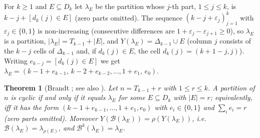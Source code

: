 \documentclass[11pt]{article}
\newtheorem{theorem}{Theorem}[section]
\theoremstyle{definition}
\newcommand{\B}{\mathcal{B}}
\renewcommand{\le}{\leqslant}
\renewcommand{\ge}{\geqslant}
\begin{document}
For $k\ge1$ and $E\subseteq D_k$ let $\lambda_E$ be the partition whose $j$-th part, $1\le j\le k$, is
$k-j+[d_k(j)\in E]$ (zero parts omitted).  The sequence $(k-j+\varepsilon_j)_{j=1}^k$ with
$\varepsilon_j\in\{0,1\}$ is non-increasing (consecutive differences are $1+\varepsilon_j-\varepsilon_{j+1}\ge0$),
so $\lambda_E$ is a partition, $|\lambda_E|=T_{k-1}+|E|$, and $Y(\lambda_E)=\Delta_{k-1}\cup E$ (column $j$ consists
of the $k-j$ cells of $\Delta_{k-1}$ and, if $d_k(j)\in E$, the cell $d_k(j)=(k+1-j,j)$).  Writing
$e_{k-j}=[d_k(j)\in E]$ we get $\lambda_E=(k-1+e_{k-1},\,k-2+e_{k-2},\dots,1+e_1,\,e_0)$.

\begin{theorem}[Brandt \cite{Br}; see also \cite{AD,Et,GH}]\label{thm:brandt}
Let $n=T_{k-1}+r$ with $1\le r\le k$.  A partition of $n$ is cyclic if and only if it equals $\lambda_E$
for some $E\subseteq D_k$ with $|E|=r$; equivalently, iff it has the form
$(k-1+e_{k-1},\dots,1+e_1,e_0)$ with $e_i\in\{0,1\}$ and $\sum_ie_i=r$ (zero parts omitted).
Moreover $Y(\B(\lambda_E))=\rho(Y(\lambda_E))$, i.e.\ $\B(\lambda_E)=\lambda_{\rho(E)}$, and $\B^k(\lambda_E)=\lambda_E$.
\end{theorem}
\end{document}
